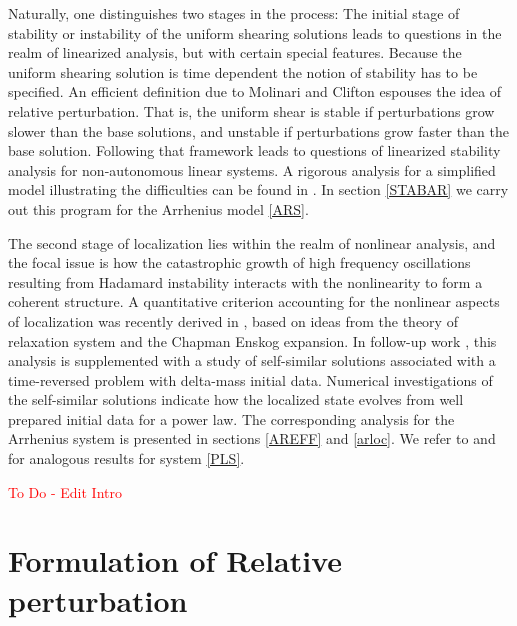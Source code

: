 \documentclass[a4paper,11pt]{article}
\newcommand{\tcr}{\textcolor{red}}
\theoremstyle{remark}
\begin{document}
Naturally, one distinguishes two stages in the process: The initial stage of stability or instability 
of the uniform shearing solutions leads to questions in the realm of linearized analysis, but with
certain special features. Because the uniform shearing solution
is time dependent the notion of stability has to be specified. An efficient definition due to
Molinari and Clifton \cite{MC,FM} espouses the idea of relative perturbation. That is, the uniform shear
is stable if perturbations grow slower than the base solutions, and unstable if perturbations grow
faster than the base solution. Following that framework leads to questions of linearized stability analysis 
for non-autonomous linear systems.
A rigorous analysis for a simplified model illustrating the difficulties can be found in \cite{Tzavaras92}.
In section \ref{STABAR}  we carry out this program for the Arrhenius model \eqref{ARS}.


The second stage of localization lies within the realm of nonlinear analysis, and the focal issue is how the catastrophic growth of high frequency oscillations resulting from Hadamard instability interacts with
the nonlinearity to form a coherent structure.
A quantitative criterion accounting for the nonlinear aspects of localization was recently derived in \cite{KT},
based on ideas from the theory of relaxation system and the Chapman Enskog expansion. In follow-up 
work \cite{KT2}, this analysis is supplemented with a study of self-similar
solutions associated with a time-reversed problem with delta-mass initial data. 
Numerical investigations of the self-similar solutions indicate how the localized state evolves 
from well prepared initial data for a  power law. The corresponding analysis for the Arrhenius system 
is presented in sections \ref{AREFF} and \ref{arloc}. 
We refer to \cite{KT} and \cite{KT2} for analogous results for system \eqref{PLS}.

%
%



\tcr{ To Do - Edit Intro}

\section{Formulation of Relative perturbation}
\end{document}
